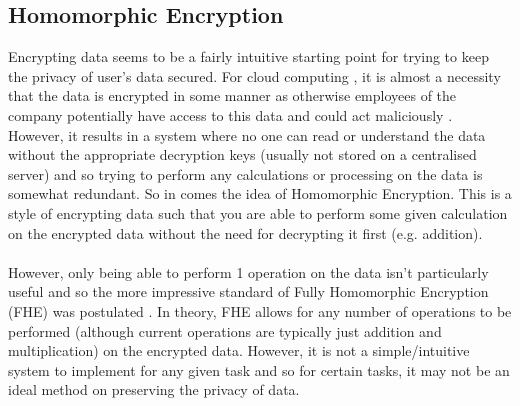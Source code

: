 \subsection{Homomorphic Encryption}
Encrypting data seems to be a fairly intuitive starting point for trying to keep the privacy of user's data secured. 
For cloud computing \cite{cloud_fhe}, it is almost a necessity that the data is encrypted in some manner as otherwise employees of the company potentially have access to this data and could act maliciously \cite{access_private}. 
However, it results in a system where no one can read or understand the data without the appropriate decryption keys (usually not stored on a centralised server) and so trying to perform any calculations or processing on the data is somewhat redundant. 
So in comes the idea of Homomorphic Encryption. This is a style of encrypting data such that you are able to perform some given calculation on the encrypted data without the need for decrypting it first (e.g. addition).
\\ \\ 
However, only being able to perform 1 operation on the data isn't particularly useful and so the more impressive standard of Fully Homomorphic Encryption (FHE) was postulated \cite{fhe}. 
In theory, FHE allows for any number of operations to be performed (although current operations are typically just addition and multiplication) on the encrypted data. 
However, it is not a simple/intuitive system to implement for any given task and so for certain tasks, it may not be an ideal method on preserving the privacy of data.


